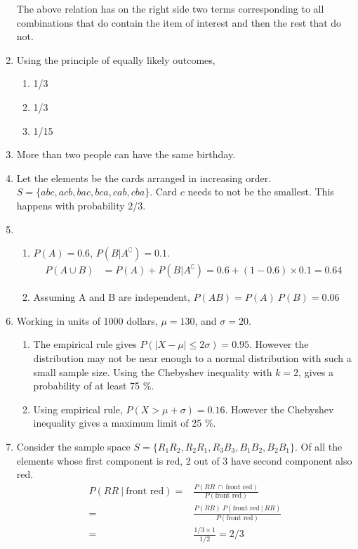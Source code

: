 \begin{enumerate}
	The above relation has on the right side two terms corresponding to all combinations that do contain the item of interest and then the rest that do not.
	
	\item Using the principle of equally likely outcomes, 
	\begin{enumerate}
		\item 1/3 
		\item 1/3 
		\item 1/15
	\end{enumerate}
	
	\item More than two people can have the same birthday.
	
	\item Let the elements be the cards arranged in increasing order.
	$ S = \{ abc, acb, bac, bca, cab, cba \} $. Card $ c $ needs to not be the smallest. This happens with probability 2/3.
	
	\item \begin{enumerate}
		\item 	$ P(A) = 0.6 $, $ P(B|A^\complement) = 0.1 $.
		\begin{align}
			P(A \cup B) &= P(A) + P(B|A^\complement) = 0.6 + (1 - 0.6) \times 0.1 = 0.64
		\end{align}
		
		\item Assuming A and B are independent, $ P(AB) = P(A)\ P(B) = 0.06$ \\
	\end{enumerate}
	
	\item Working in units of 1000 dollars, $ \mu = 130 $, and $ \sigma = 20 $. 
	\begin{enumerate}
		\item The empirical rule gives $ P(|X - \mu| \leq 2 \sigma) =  0.95$. However the distribution may not be near enough to a normal distribution with such a small sample size. Using the Chebyshev inequality with $ k = 2 $, gives a probability of at least 75 \%.
		
		\item Using empirical rule, $ P(X > \mu + \sigma) = 0.16 $. However the Chebyshev inequality gives a maximum limit of 25 \%.
	\end{enumerate} 
	
	\item Consider the sample space $S = \{ R_1 R_2, R_2 R_1, R_3 B_3, B_1 B_2, B_2 B_1 \} $. Of all the elements whose first component is red, 2 out of 3 have second component also red.
	\begin{subequations}
		\begin{align}
			P(RR\ |\ \text{front red}) =& \frac{P(RR \ \cap \  \text{front red})}{P(\text{front red})} \\
			=& \frac{P(RR) \ P(\text{front red}\ |\ RR)}{P(\text{front red})} \\
			=& \frac{1/3 \times 1}{1/2} = 2/3
		\end{align}
	\end{subequations} \\
	

\end{enumerate}
